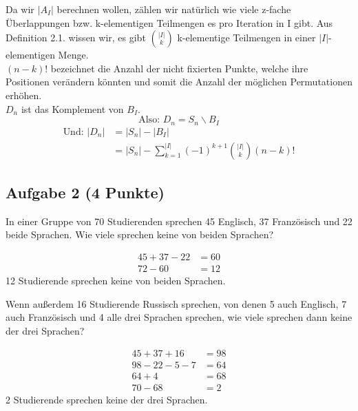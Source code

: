 \documentclass{article} %
\begin{document}
\begin{enumerate}
\begin{mybox}
    Da wir $|A_I|$ berechnen wollen, zählen wir natürlich wie viele z-fache Überlappungen bzw. k-elementigen Teilmengen es pro Iteration in I gibt. Aus Definition 2.1. wissen wir, es gibt $\binom{|I|}{k}$ k-elementige Teilmengen in einer $|I|$-elementigen Menge. \\
    $(n-k)!$ bezeichnet die Anzahl der nicht fixierten Punkte, welche ihre Positionen verändern könnten und somit die Anzahl der möglichen Permutationen erhöhen. \\
    $D_n$ ist das Komplement von $B_I$.   
    \[
    \text{Also: } D_n = S_n \backslash B_I
    \]
    \begin{align*}
         \text{Und: } |D_n| & = |S_n| - |B_I| \\
        & = |S_n| - \sum_{k=1}^{|I|} (-1)^{k+1} \binom{|I|}{k} (n - k)! 
    \end{align*}
    
\end{mybox}
\end{enumerate}


\subsection{Aufgabe 2 (4 Punkte)}
In einer Gruppe von 70 Studierenden sprechen 45 Englisch, 37 Französisch und 22 beide
Sprachen. Wie viele sprechen keine von beiden Sprachen?
\begin{mybox}
\begin{align*}
    45 + 37 - 22 & = 60 \\
    72 - 60 & = 12
\end{align*}
12 Studierende sprechen keine von beiden Sprachen. 
\end{mybox}
\noindent Wenn außerdem 16 Studierende Russisch sprechen, von denen 5 auch Englisch, 7 auch
Französisch und 4 alle drei Sprachen sprechen, wie viele sprechen dann keine der drei
Sprachen?
\begin{mybox}
\begin{align*}
    45 + 37 + 16 & = 98 \\
    98 - 22 - 5 - 7 & = 64 \\
    64 + 4 & = 68 \\ 
    70 - 68 & = 2 
\end{align*}
2 Studierende sprechen keine der drei Sprachen.
\end{mybox}
\end{document}

